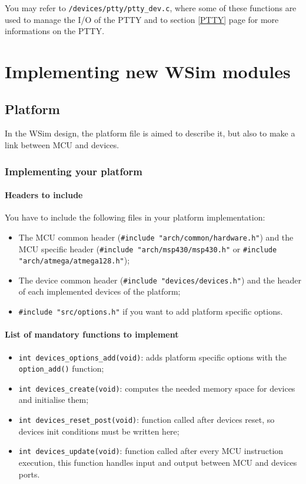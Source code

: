 \documentclass[a4paper,10pt]{report}
\begin{document}
You may refer to \verb$/devices/ptty/ptty_dev.c$, where some of these functions are used to manage the I/O of the PTTY and to section \ref{PTTY} page \pageref{PTTY} for more informations on the PTTY.


\chapter{Implementing new WSim modules}

\section{Platform}
In the WSim design, the platform file is aimed to describe it, but also to make a link between MCU and devices.
\subsection{Implementing your platform}
\subsubsection{Headers to include}
You have to include the following files in your platform implementation:
\begin{itemize}
  \item The MCU common header (\verb$#include "arch/common/hardware.h"$) and the MCU specific header (\verb$#include "arch/msp430/msp430.h"$ or \verb$#include "arch/atmega/atmega128.h"$);
  \item The device common header (\verb$#include "devices/devices.h"$) and the header of each implemented devices of the platform;
  \item \verb$#include "src/options.h"$ if you want to add platform specific options.
\end{itemize}

\subsubsection{List of mandatory functions to implement}
\begin{itemize}
  \item \verb$int devices_options_add(void)$: adds platform specific options with the \verb$option_add()$ function;
  \item \verb$int devices_create(void)$: computes the needed memory space for devices and initialise them;
  \item \verb$int devices_reset_post(void)$: function called after devices reset, so devices init conditions must be written here;	
  \item \verb$int devices_update(void)$: function called after every MCU instruction execution, this function handles input and output between MCU and devices ports.
\end{itemize}
\end{document}
